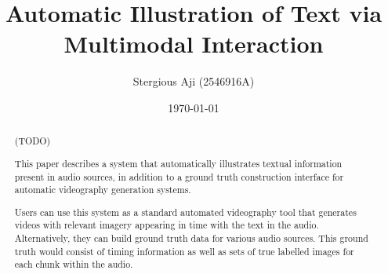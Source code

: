 \documentclass{l4proj}
\begin{document}
\title{Automatic Illustration of Text via Multimodal Interaction}
\author{Stergious Aji (2546916A)}
\date{\today}

\maketitle

\begin{abstract}
    (TODO)

    This paper describes a system that automatically illustrates textual information present in audio sources, in addition to a ground truth construction interface for automatic videography generation systems.
    
    Users can use this system as a standard automated videography tool that generates videos with relevant imagery appearing in time with the text in the audio. Alternatively, they can build ground truth data for various audio sources. This ground truth would consist of timing information as well as sets of true labelled images for each chunk within the audio.

    
    
\end{abstract}

%

%
\end{document}
